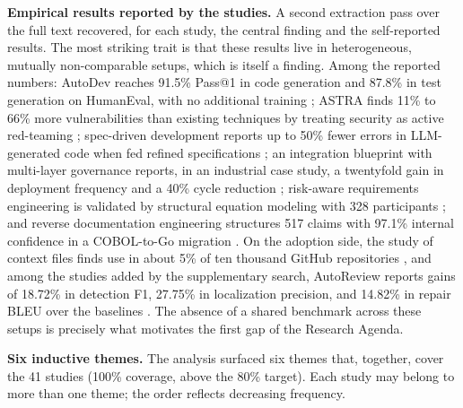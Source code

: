 \noindent\textbf{Empirical results reported by the studies.} A second extraction pass over the full text recovered, for each study, the central finding and the self-reported results. The most striking trait is that these results live in heterogeneous, mutually non-comparable setups, which is itself a finding. Among the reported numbers: AutoDev reaches 91.5\% Pass@1 in code generation and 87.8\% in test generation on HumanEval, with no additional training \cite{MicheleTufano2024}; ASTRA finds 11\% to 66\% more vulnerabilities than existing techniques by treating security as active red-teaming \cite{XiangzheXu2025}; spec-driven development reports up to 50\% fewer errors in LLM-generated code when fed refined specifications \cite{DeepakBabuPiskala2026}; an integration blueprint with multi-layer governance reports, in an industrial case study, a twentyfold gain in deployment frequency and a 40\% cycle reduction \cite{SKaruppuchamy2026}; risk-aware requirements engineering is validated by structural equation modeling with 328 participants \cite{Watfa2026}; and reverse documentation engineering structures 517 claims with 97.1\% internal confidence in a COBOL-to-Go migration \cite{Macedo2026}. On the adoption side, the study of context files finds use in about 5\% of ten thousand GitHub repositories \cite{SeyedmoeinMohsenimofidi2025}, and among the studies added by the supplementary search, AutoReview reports gains of 18.72\% in detection F1, 27.75\% in localization precision, and 14.82\% in repair BLEU over the baselines \cite{Chen2025}. The absence of a shared benchmark across these setups is precisely what motivates the first gap of the Research Agenda.

\noindent\textbf{Six inductive themes.} The analysis surfaced six themes that, together, cover the 41 studies (100\% coverage, above the 80\% target). Each study may belong to more than one theme; the order reflects decreasing frequency.

